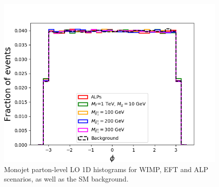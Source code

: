 \documentclass[prd,aps,letterpaper,floatfix,superscriptaddress,preprintnumbers,twocolumn,10pt,nofootinbib]{revtex4-1}
\begin{document}
\begin{figure}[t!]
\includegraphics[scale=0.3]{figures/phijallsb.png}
\caption{Monojet parton-level LO 1D histograms for WIMP, EFT and ALP scenarios, as well as the SM background.\label{1DfeaturesPL1}}
\end{figure}
\end{document}
